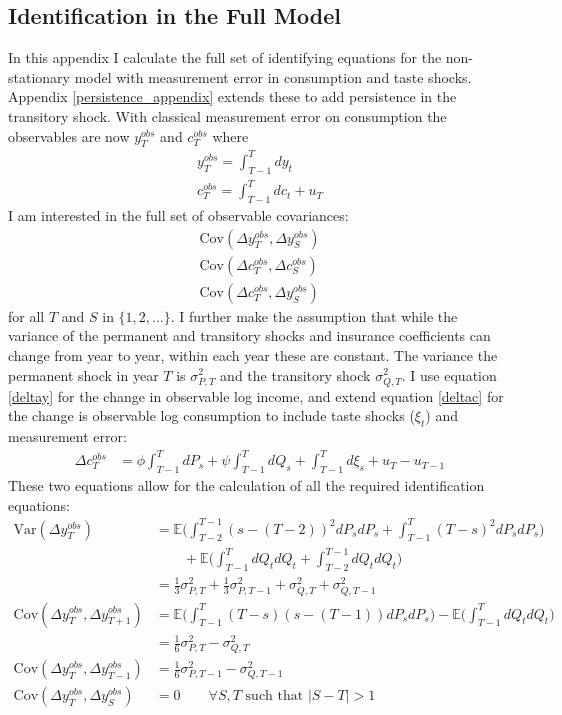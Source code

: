 \subsection{Identification in the Full Model} \label{identification}
In this appendix I calculate the full set of identifying equations for the non-stationary model with measurement error in consumption and taste shocks. Appendix \ref{persistence_appendix} extends these to add persistence in the transitory shock. With classical measurement error on consumption the observables are now $y^{obs}_T$ and $c^{obs}_T$ where
\begin{align*}
y^{obs}_T = \int_{T-1}^{T} dy_t \\
c^{obs}_T = \int_{T-1}^{T} dc_t + u_T
\end{align*}
I am interested in the full set of observable covariances:
\begin{align*}
\mathrm{Cov}(\Delta y^{obs}_T, \Delta y^{obs}_S) \\
\mathrm{Cov}(\Delta c^{obs}_T, \Delta c^{obs}_S) \\
\mathrm{Cov}(\Delta c^{obs}_T,  \Delta y^{obs}_S)
\end{align*}
for all $T$ and $S$ in $\{1,2,...\}$. I further make the assumption that while the variance of the permanent and transitory shocks and insurance coefficients can change from year to year, within each year these are constant. The variance the permanent shock in year $T$ is $\sigma^2_{P,T}$ and the transitory shock $\sigma^2_{Q,T}$. I use equation \ref{deltay} for the change in observable log income, and extend equation \ref{deltac} for the change is observable log consumption to include taste shocks ($\xi_t$) and measurement error:
\begin{align*}
\Delta c^{obs}_T &= \phi  \int_{T-1}^{T} dP_s  +\psi \int_{T-1}^{T}dQ_s +\int_{T-1}^{T}d\xi_s  + u_T - u_{T-1} \nonumber
\end{align*}
These two equations allow for the calculation of all the required identification equations:
\begin{align}
\mathrm{Var}(\Delta y^{obs}_T) &= \mathbb{E} \Big(\int_{T-2}^{T-1} (s-(T-2))^2 dP_s dP_s  + \int_{T-1}^{T} (T-s)^2 dP_s dP_s \Big) \nonumber \\
& \qquad + \mathbb{E} \Big(\int_{T-1}^{T} dQ_t dQ_t +\int_{T-2}^{T-1} dQ_t dQ_t \Big) \nonumber \\
&= \frac{1}{3} \sigma^2_{P,T} + \frac{1}{3} \sigma^2_{P,T-1} +  \sigma^2_{Q,T} +  \sigma^2_{Q,T-1} \label{inc_var_indentification}\\
\mathrm{Cov}(\Delta y^{obs}_T, \Delta y^{obs}_{T+1}) &=  \mathbb{E} \Big(\int_{T-1}^{T} (T-s)(s-(T-1)) dP_s dP_s  \Big) - \mathbb{E} \Big(\int_{T-1}^{T} dQ_t dQ_t \Big) \nonumber \\
&= \frac{1}{6}\sigma^2_{P,T} - \sigma^2_{Q,T} \nonumber\\
\mathrm{Cov}(\Delta y^{obs}_T, \Delta y^{obs}_{T-1}) &= \frac{1}{6}\sigma^2_{P,T-1} - \sigma^2_{Q,T-1} \nonumber\\
\mathrm{Cov}(\Delta y^{obs}_T, \Delta y^{obs}_{S}) &= 0 \qquad \forall S,T \text{ such that }|S-T| >1 \nonumber
\end{align}
